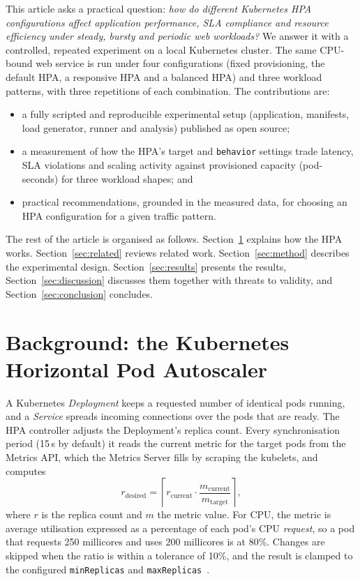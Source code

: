 \documentclass[conference,a4paper]{IEEEtran}
\begin{document}
This article asks a practical question: \emph{how do different Kubernetes HPA
configurations affect application performance, SLA compliance and resource
efficiency under steady, bursty and periodic web workloads?} We answer it with
a controlled, repeated experiment on a local Kubernetes cluster. The same
CPU-bound web service is run under four configurations (fixed provisioning,
the default HPA, a responsive HPA and a balanced HPA) and three workload
patterns, with three repetitions of each combination. The contributions are:
\begin{itemize}
  \item a fully scripted and reproducible experimental setup (application,
        manifests, load generator, runner and analysis) published as open
        source;
  \item a measurement of how the HPA's target and \texttt{behavior} settings
        trade latency, SLA violations and scaling activity against
        provisioned capacity (pod-seconds) for three workload shapes; and
  \item practical recommendations, grounded in the measured data, for choosing
        an HPA configuration for a given traffic pattern.
\end{itemize}

The rest of the article is organised as follows. Section~\ref{sec:background}
explains how the HPA works. Section~\ref{sec:related} reviews related work.
Section~\ref{sec:method} describes the experimental design.
Section~\ref{sec:results} presents the results, Section~\ref{sec:discussion}
discusses them together with threats to validity, and
Section~\ref{sec:conclusion} concludes.

\section{Background: the Kubernetes Horizontal Pod Autoscaler}
\label{sec:background}

A Kubernetes \emph{Deployment} keeps a requested number of identical pods
running, and a \emph{Service} spreads incoming connections over the pods that
are ready. The HPA controller adjusts the Deployment's replica count. Every
synchronisation period (15\,s by default) it reads the current metric for the
target pods from the Metrics API, which the Metrics Server fills by scraping
the kubelets, and computes
\begin{equation}
  r_{\text{desired}} = \left\lceil r_{\text{current}} \cdot
  \frac{m_{\text{current}}}{m_{\text{target}}} \right\rceil ,
  \label{eq:hpa}
\end{equation}
where $r$ is the replica count and $m$ the metric value.
For CPU, the metric is average utilisation expressed as a percentage of each
pod's CPU \emph{request}, so a pod that requests 250 millicores and uses
200 millicores is at 80\%. Changes are skipped when the ratio is within a
tolerance of 10\%, and the result is clamped to the configured
\texttt{minReplicas} and \texttt{maxReplicas}~\cite{nguyen2020horizontal}.
\end{document}
